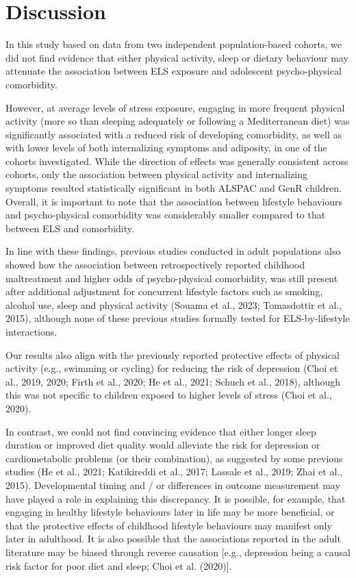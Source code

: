 \documentclass[
  letterpaper,
  DIV=11,
  numbers=noendperiod]{scrreport}
\begin{document}
\section{Discussion}\label{discussion-1}

In this study based on data from two independent population-based
cohorts, we did not find evidence that either physical activity, sleep
or dietary behaviour may attenuate the association between ELS exposure
and adolescent psycho-physical comorbidity.

However, at average levels of stress exposure, engaging in more frequent
physical activity (more so than sleeping adequately or following a
Mediterranean diet) was significantly associated with a reduced risk of
developing comorbidity, as well as with lower levels of both
internalizing symptoms and adiposity, in one of the cohorts
investigated. While the direction of effects was generally consistent
across cohorts, only the association between physical activity and
internalizing symptoms resulted statistically significant in both ALSPAC
and GenR children. Overall, it is important to note that the association
between lifestyle behaviours and psycho-physical comorbidity was
considerably smaller compared to that between ELS and comorbidity.

In line with these findings, previous studies conducted in adult
populations also showed how the association between retrospectively
reported childhood maltreatment and higher odds of psycho-physical
comorbidity, was still present after additional adjustment for
concurrent lifestyle factors such as smoking, alcohol use, sleep and
physical activity (Souama et al., 2023; Tomasdottir et al., 2015),
although none of these previous studies formally tested for
ELS-by-lifestyle interactions.

Our results also align with the previously reported protective effects
of physical activity (e.g., swimming or cycling) for reducing the risk
of depression (Choi et al., 2019, 2020; Firth et al., 2020; He et al.,
2021; Schuch et al., 2018), although this was not specific to children
exposed to higher levels of stress (Choi et al., 2020).

In contrast, we could not find convincing evidence that either longer
sleep duration or improved diet quality would alleviate the risk for
depression or cardiometabolic problems (or their combination), as
suggested by some previous studies (He et al., 2021; Katikireddi et al.,
2017; Lassale et al., 2019; Zhai et al., 2015). Developmental timing and
/ or differences in outcome measurement may have played a role in
explaining this discrepancy. It is possible, for example, that engaging
in healthy lifestyle behaviours later in life may be more beneficial, or
that the protective effects of childhood lifestyle behaviours may
manifest only later in adulthood. It is also possible that the
associations reported in the adult literature may be biased through
reverse causation {[}e.g., depression being a causal risk factor for
poor diet and sleep; Choi et al. (2020){]}.
\end{document}
